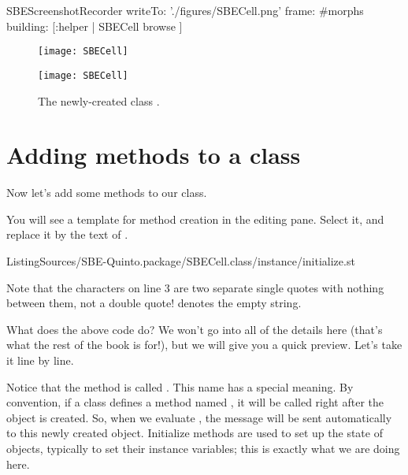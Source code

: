 \documentclass[a4paper,10pt,twoside]{book}
\begin{document}

\begin{ExecuteSmalltalkScript}
SBEScreenshotRecorder writeTo: './figures/SBECell.png' frame: #morphs building: [:helper |
  SBECell browse
]
\end{ExecuteSmalltalkScript}
\begin{figure}[h!t]
\ifluluelse
	{\centerline {\texttt{[image: SBECell]}}}
	{\centerline {\texttt{[image: SBECell]}}}
\caption{The newly-created class \label{fig:SBECell}.}
\end{figure}

\section{Adding methods to a class}

Now let's add some methods to our class.

You will see a template for method creation in the editing pane.
Select it, and replace it by the text of .

%
{ListingSources/SBE-Quinto.package/SBECell.class/instance/initialize.st}

\noindent
Note that the characters  on line 3 are two separate single quotes with nothing between them, not a double quote!
 denotes the empty string.


What does the above code do?
We won't go into all of the details here (that's what the rest of the book is for!), but we will give you a quick preview.
Let's take it line by line.

Notice that the method is called .
This name has a special meaning.
By convention, if a class defines a method named , it will be called right after the object is created.
So, when we evaluate , the message  will be sent automatically to this newly created object.
Initialize methods are used to set up the state of objects, typically to set their instance variables; this is exactly what we are doing here.
\end{document}
